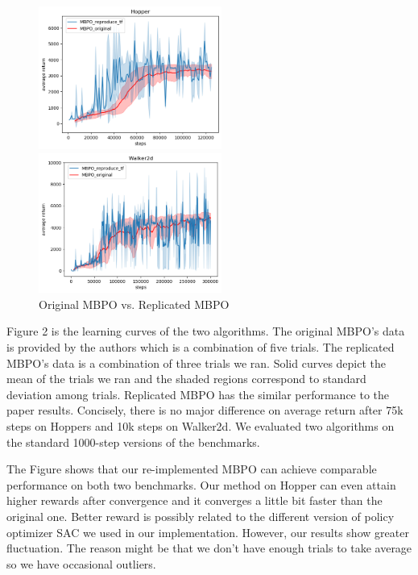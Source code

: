 \begin{figure}[h]
\centering
\begin{minipage}[t]{0.48\textwidth}
\centering
\includegraphics[width=6cm]{../openreview/compareToOriginHopper}
\end{minipage}
\begin{minipage}[t]{0.48\textwidth}
\centering
\includegraphics[width=6cm]{../openreview/compareToOriginWalker2d}
\end{minipage}
\caption{Original MBPO vs. Replicated MBPO}
\end{figure}

Figure 2 is the learning curves of the two algorithms. The original MBPO's data is provided by the authors which is a combination of five trials. The replicated MBPO's data is a combination of three trials we ran. Solid curves depict the mean of the trials we ran and the shaded regions correspond to standard deviation among trials. Replicated MBPO has the similar performance to the paper results. Concisely, there is no major difference on average return after 75k steps on Hoppers and 10k steps on Walker2d. We evaluated two algorithms on the standard 1000-step versions of the benchmarks.

The Figure shows that our re-implemented MBPO can achieve comparable performance on both two benchmarks. Our method on Hopper can even attain higher rewards after convergence and it converges a little bit faster than the original one. Better reward is possibly related to the different version of policy optimizer SAC we used in our implementation. However, our results show greater fluctuation. The reason might be that we don't have enough  trials to take average so we have occasional outliers. 

